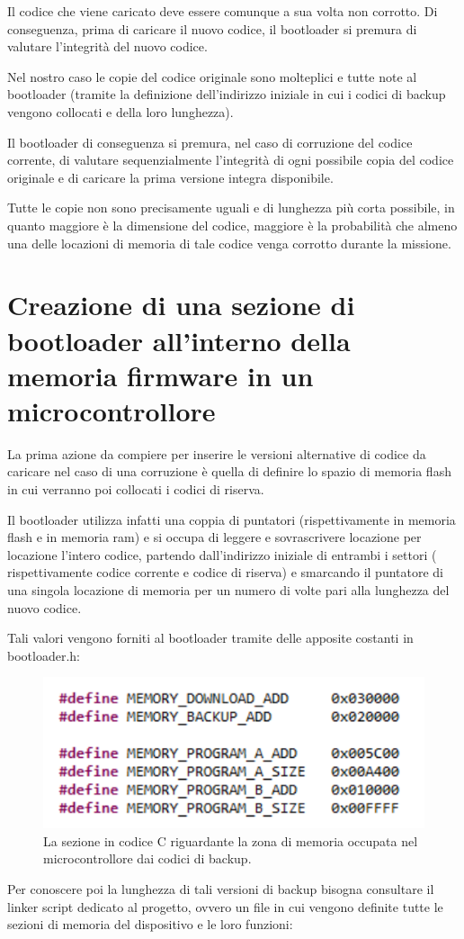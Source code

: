 \documentclass[LaM,binding=0.6cm,oneside]{../sapthesis}
\begin{document}
Il codice che viene caricato deve essere comunque a sua volta non corrotto. Di conseguenza, prima di caricare il nuovo codice, il bootloader si premura di valutare l'integrità del nuovo codice.

Nel nostro caso le copie del codice originale sono molteplici e tutte note al bootloader (tramite la definizione dell'indirizzo iniziale in cui i codici di backup vengono collocati e della loro lunghezza).

Il bootloader di conseguenza si premura, nel caso di corruzione del codice corrente, di valutare sequenzialmente l'integrità di ogni possibile copia del codice originale e di caricare la prima versione integra disponibile.

Tutte le copie non sono precisamente uguali e di lunghezza più corta possibile, in quanto maggiore è la dimensione del codice, maggiore è la probabilità che almeno una delle locazioni di memoria di tale codice venga corrotto durante la missione.



\section{Creazione di una sezione di bootloader all'interno della memoria firmware in un microcontrollore}

La prima azione da compiere per inserire le versioni alternative di codice da caricare nel caso di una corruzione è quella di definire lo spazio di memoria flash in cui verranno poi collocati i codici di riserva.

Il bootloader utilizza  infatti una coppia di puntatori (rispettivamente in memoria flash e in memoria ram) e si occupa di leggere e sovrascrivere locazione per locazione l'intero codice,
partendo dall'indirizzo iniziale di entrambi i settori ( rispettivamente codice corrente e codice di riserva) e smarcando il puntatore di una singola locazione di memoria per un numero di volte pari alla lunghezza del nuovo codice.\newline

Tali valori vengono forniti al bootloader tramite delle apposite costanti in bootloader.h:

\begin{figure}[htbp]
\centerline{\includegraphics[scale=.7]{examples/BackupSection.PNG}}
\caption{La sezione in codice C riguardante la zona di memoria occupata nel microcontrollore dai codici di backup.}
\label{fig}
\end{figure}
\newpage
Per conoscere poi la lunghezza di tali versioni di backup bisogna consultare il linker script dedicato al progetto, ovvero un file in cui vengono definite tutte le sezioni di memoria del dispositivo e le loro funzioni:
\end{document}
